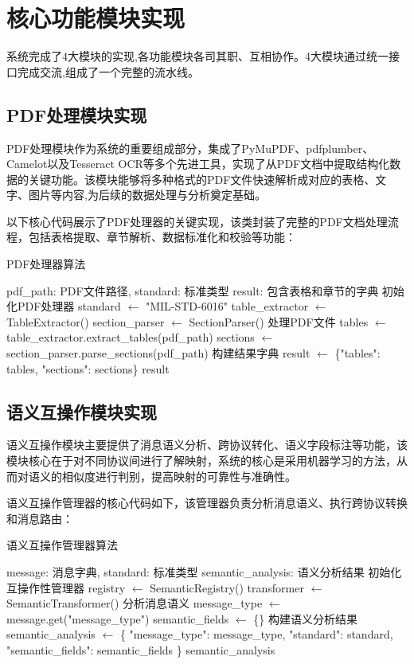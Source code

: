 \section{核心功能模块实现}

系统完成了4大模块的实现,各功能模块各司其职、互相协作。4大模块通过统一接口完成交流,组成了一个完整的流水线。

\subsection{PDF处理模块实现}

PDF处理模块作为系统的重要组成部分，集成了PyMuPDF、pdfplumber、Camelot以及Tesseract OCR等多个先进工具，实现了从PDF文档中提取结构化数据的关键功能。该模块能够将多种格式的PDF文件快速解析成对应的表格、文字、图片等内容,为后续的数据处理与分析奠定基础。

以下核心代码展示了PDF处理器的关键实现，该类封装了完整的PDF文档处理流程，包括表格提取、章节解析、数据标准化和校验等功能：

\begin{algorithm}[H]
\caption{PDF处理器算法}
\begin{algorithmic}[1]
\REQUIRE pdf\_path: PDF文件路径, standard: 标准类型
\ENSURE result: 包含表格和章节的字典
\STATE 初始化PDF处理器
\STATE standard $\leftarrow$ "MIL-STD-6016"
\STATE table\_extractor $\leftarrow$ TableExtractor()
\STATE section\_parser $\leftarrow$ SectionParser()
\STATE 处理PDF文件
\STATE tables $\leftarrow$ table\_extractor.extract\_tables(pdf\_path)
\STATE sections $\leftarrow$ section\_parser.parse\_sections(pdf\_path)
\STATE 构建结果字典
\STATE result $\leftarrow$ \{"tables": tables, "sections": sections\}
\RETURN result
\end{algorithmic}
\end{algorithm}

\subsection{语义互操作模块实现}

语义互操作模块主要提供了消息语义分析、跨协议转化、语义字段标注等功能，该模块核心在于对不同协议间进行了解映射，系统的核心是采用机器学习的方法，从而对语义的相似度进行判别，提高映射的可靠性与准确性。

语义互操作管理器的核心代码如下，该管理器负责分析消息语义、执行跨协议转换和消息路由：

\begin{algorithm}[H]
\caption{语义互操作管理器算法}
\begin{algorithmic}[1]
\REQUIRE message: 消息字典, standard: 标准类型
\ENSURE semantic\_analysis: 语义分析结果
\STATE 初始化互操作性管理器
\STATE registry $\leftarrow$ SemanticRegistry()
\STATE transformer $\leftarrow$ SemanticTransformer()
\STATE 分析消息语义
\STATE message\_type $\leftarrow$ message.get("message\_type")
\STATE semantic\_fields $\leftarrow$ \{\}
\STATE 构建语义分析结果
\STATE semantic\_analysis $\leftarrow$ \{
\STATE     "message\_type": message\_type,
\STATE     "standard": standard,
\STATE     "semantic\_fields": semantic\_fields
\STATE \}
\RETURN semantic\_analysis
\end{algorithmic}
\end{algorithm}

